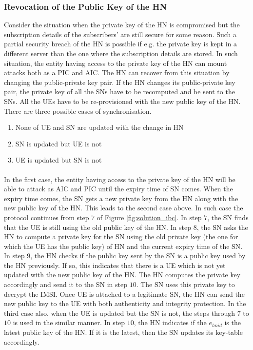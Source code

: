 \documentclass[lnicst,sechang,a4paper]{svmultln}
\begin{document}
\subsubsection{Revocation of the Public Key of the HN}
Consider the situation when the private key of the HN is compromised but the subscription details of the subscribers' are still secure for some reason. Such a partial security breach of the HN is possible if e.g. the private key is kept in a different server than the one where the subscription details are stored. In such situation, the entity having access to the private key of the HN can mount attacks both as a PIC and AIC. The HN can recover from this situation by changing the public-private key pair. If the HN changes its public-private key pair, the private key of all the SNs have to be recomputed and be sent to the SNs. All the UEs have to be re-provisioned with the new public key of the HN. There are three possible cases of synchronisation.
\begin{enumerate}
\item None of UE and SN are updated with the change in HN
\item SN is updated but UE is not
\item UE is updated but SN is not
\end{enumerate} 
\paragraph{}
In the first case, the entity having access to the private key of the HN will be able to attack as AIC and PIC until the expiry time of SN comes. When the expiry time comes, the SN gets a new private key from the HN along with the new public key of the HN. This leads to the second case above. In such case the protocol continues from step $7$ of Figure \ref{fig:solution_ibc}. In step $7$, the SN finds that the UE is still using the old public key of the HN. In step $8$, the SN asks the HN to compute a private key for the SN using the old private key (the one for which the UE has the public key) of HN and the current expiry time of the SN. In step $9$, the HN checks if the public key sent by the SN is a public key used by the HN previously. If so, this indicates that there is a UE which is not yet updated with the new public key of the HN. The HN computes the private key accordingly and send it to the SN in step $10$. The SN uses this private key to decrypt the IMSI. Once UE is attached to a legitimate SN, the HN can send the new public key to the UE with both authenticity and integrity protection. In the third case also, when the UE is updated but the SN is not, the steps through $7$ to $10$ is used in the similar manner. In step $10$, the HN indicates if the $e_{hnid}$ is the latest public key of the HN. If it is the latest, then the SN updates its key-table accordingly.
\end{document}
